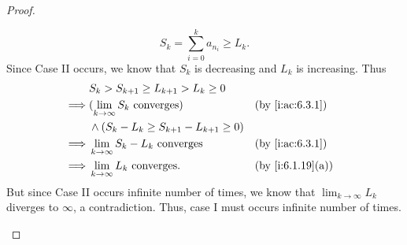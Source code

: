 \begin{proof}
\begin{itemize}
          \[
            S_k = \sum_{i = 0}^k a_{n_i} \geq L_k.
          \]
          Since Case II occurs, we know that \(S_k\) is decreasing and \(L_k\) is increasing.
          Thus
          \begin{align*}
                     & S_k > S_{k + 1} \geq L_{k + 1} > L_k \geq 0                               \\
            \implies & (\lim_{k \to \infty} S_k \text{ converges})         &  & \by{i:ac:6.3.1}  \\
                     & \land (S_k - L_k \geq S_{k + 1} - L_{k + 1} \geq 0)                       \\
            \implies & \lim_{k \to \infty} S_k - L_k \text{ converges}     &  & \by{i:ac:6.3.1}  \\
            \implies & \lim_{k \to \infty} L_k \text{ converges}.          &  & \by{i:6.1.19}[a]
          \end{align*}
          But since Case II occurs infinite number of times, we know that \(\lim_{k \to \infty} L_k\) diverges to \(\infty\), a contradiction.
          Thus, case I must occurs infinite number of times.


\end{itemize}
\end{proof}
